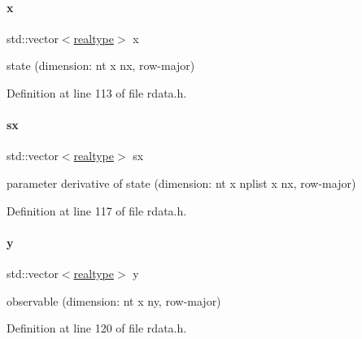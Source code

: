 \mbox{\label{classamici_1_1_return_data_a7ca297ad69affe8b20e8f81b9eb38cd1}} 
\paragraph{\texorpdfstring{x}{x}}
{\footnotesize\ttfamily std\+::vector$<$\mbox{\hyperlink{namespaceamici_a1bdce28051d6a53868f7ccbf5f2c14a3}{realtype}}$>$ x}

state (dimension\+: nt x nx, row-\/major) 

Definition at line 113 of file rdata.\+h.

\mbox{\label{classamici_1_1_return_data_ac3288cc7f649605938f1fd1b459d3d8c}} 
\paragraph{\texorpdfstring{sx}{sx}}
{\footnotesize\ttfamily std\+::vector$<$\mbox{\hyperlink{namespaceamici_a1bdce28051d6a53868f7ccbf5f2c14a3}{realtype}}$>$ sx}

parameter derivative of state (dimension\+: nt x nplist x nx, row-\/major) 

Definition at line 117 of file rdata.\+h.

\mbox{\label{classamici_1_1_return_data_accf479492e699cb5e931c2a698148924}} 
\paragraph{\texorpdfstring{y}{y}}
{\footnotesize\ttfamily std\+::vector$<$\mbox{\hyperlink{namespaceamici_a1bdce28051d6a53868f7ccbf5f2c14a3}{realtype}}$>$ y}

observable (dimension\+: nt x ny, row-\/major) 

Definition at line 120 of file rdata.\+h.

\mbox{\label{classamici_1_1_return_data_a7dc280c0479f4a1fffe67fea251c26d2}} 
